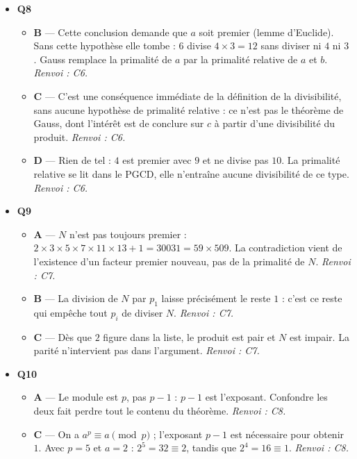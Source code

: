 \begin{itemize}
\begin{itemize}
    \item \textbf{D} — C'est l'inverse : ne pas être premiers entre eux impose au second membre d'être multiple du PGCD. Si $6$ et $9$ étaient premiers entre eux, l'équation aurait des solutions pour tout $c$. \emph{Renvoi : C4.}
  \end{itemize}
  \item \textbf{Q8}
  \begin{itemize}
    \item \textbf{B} — Cette conclusion demande que $a$ soit premier (lemme d'Euclide). Sans cette hypothèse elle tombe : $6$ divise $4\times3=12$ sans diviser ni $4$ ni $3$. Gauss remplace la primalité de $a$ par la primalité relative de $a$ et $b$. \emph{Renvoi : C6.}
    \item \textbf{C} — C'est une conséquence immédiate de la définition de la divisibilité, sans aucune hypothèse de primalité relative : ce n'est pas le théorème de Gauss, dont l'intérêt est de conclure sur $c$ à partir d'une divisibilité du produit. \emph{Renvoi : C6.}
    \item \textbf{D} — Rien de tel : $4$ est premier avec $9$ et ne divise pas $10$. La primalité relative se lit dans le PGCD, elle n'entraîne aucune divisibilité de ce type. \emph{Renvoi : C6.}
  \end{itemize}
  \item \textbf{Q9}
  \begin{itemize}
    \item \textbf{A} — $N$ n'est pas toujours premier : $2\times3\times5\times7\times11\times13+1=30031=59\times509$. La contradiction vient de l'existence d'un facteur premier nouveau, pas de la primalité de $N$. \emph{Renvoi : C7.}
    \item \textbf{B} — La division de $N$ par $p_1$ laisse précisément le reste $1$ : c'est ce reste qui empêche tout $p_i$ de diviser $N$. \emph{Renvoi : C7.}
    \item \textbf{C} — Dès que $2$ figure dans la liste, le produit est pair et $N$ est impair. La parité n'intervient pas dans l'argument. \emph{Renvoi : C7.}
  \end{itemize}
  \item \textbf{Q10}
  \begin{itemize}
    \item \textbf{A} — Le module est $p$, pas $p-1$ : $p-1$ est l'exposant. Confondre les deux fait perdre tout le contenu du théorème. \emph{Renvoi : C8.}
    \item \textbf{C} — On a $a^{p}\equiv a\pmod p$ ; l'exposant $p-1$ est nécessaire pour obtenir $1$. Avec $p=5$ et $a=2$ : $2^5=32\equiv2$, tandis que $2^4=16\equiv1$. \emph{Renvoi : C8.}

\end{itemize}
\end{itemize}
